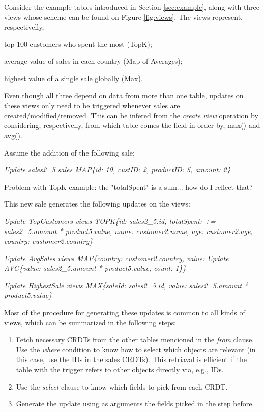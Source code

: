 \documentclass{vldb}
\newcommand{\grumbler}[2]{{\color{red}{\bf #1:} #2}}
\newcommand{\andre}[1]{\grumbler{andre}{#1}}
\newcommand{\emphvspace}{0.5\baselineskip}
\newcommand{\lineemph}[1]{\vspace{\emphvspace}\hspace{2em}\emph{#1}\vspace{\emphvspace}}
\newcommand{\firstblockemph}[1]{\vspace{\emphvspace}\hspace{2em}\emph{#1}}
\newcommand{\middleblockemph}[1]{\hspace{2em}\emph{#1}}
\newcommand{\lastblockemph}[1]{\hspace{2em}\emph{#1}\vspace{\emphvspace}}
\begin{document}

Consider the example tables introduced in Section \ref{sec:example}, along with three views whose scheme can be found on Figure \ref{fig:views}.
The views represent, respectivelly, 
\begin{enumerate*}[label=(\roman*)]
	\item \label{item:topk} top 100 customers who spent the most (TopK);
	\item \label{item:avg} average value of sales in each country (Map of Averages);
	\item \label{item:max} highest value of a single sale globally (Max).
\end{enumerate*}
Even though all three depend on data from more than one table, updates on these views only need to be triggered whenever sales are created/modified/removed.
This can be infered from the \emph{create view} operation by considering, respectivelly, from which table comes the field in order by, max() and avg().

Assume the addition of the following sale:

\lineemph{Update sales2\_5 sales MAP\{id: 10, custID: 2, productID: 5, amount: 2\}}

\andre{Problem with TopK example: the "totalSpent" is a sum... how do I reflect that?}

This new sale generates the following updates on the views:

\firstblockemph{Update TopCustomers views TOPK\{id: sales2\_5.id, totalSpent: += sales2\_5.amount * product5.value, name: customer2.name, age: customer2.age, country: customer2.country\}}

\middleblockemph{Update AvgSales views MAP\{country: customer2.country, value: Update AVG\{value: sales2\_5.amount * product5.value, count: 1\}\}}

\lastblockemph{Update HighestSale views MAX\{saleId: sales2\_5.id, value: sales2\_5.amount * product5.value\}}

Most of the procedure for generating these updates is common to all kinds of views, which can be summarized in the following steps:

\begin{enumerate}
	\item Fetch necessary CRDTs from the other tables mencioned in the \emph{from} clause. 
	Use the \emph{where} condition to know how to select which objects are relevant (in this case, use the IDs in the sales CRDTs).
	This retriaval is efficient if the table with the trigger refers to other objects directly via, e.g., IDs.
	\item Use the \emph{select} clause to know which fields to pick from each CRDT.
	\item Generate the update using as arguments the fields picked in the step before.
\end{enumerate}
\end{document}
